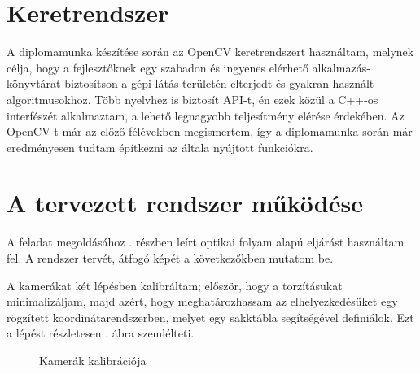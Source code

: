 \section{Keretrendszer}

A diplomamunka készítése során az OpenCV \cite{opencv} keretrendszert használtam, melynek célja, hogy a fejlesztőknek egy szabadon és ingyenes elérhető alkalmazás-könyvtárat biztosítson a gépi látás területén elterjedt és gyakran használt algoritmusokhoz. Több nyelvhez is biztosít API-t, én ezek közül a C++-os interfészét alkalmaztam, a lehető legnagyobb teljesítmény elérése érdekében. Az OpenCV-t már az előző félévekben megismertem, így a diplomamunka során már eredményesen tudtam építkezni az általa nyújtott funkciókra.

\section{A tervezett rendszer működése}

A feladat megoldásához . részben leírt optikai folyam alapú eljárást használtam fel. A rendszer tervét, átfogó képét a következőkben mutatom be.

A kamerákat két lépésben kalibráltam; először, hogy a torzításukat minimalizáljam, majd azért, hogy meghatározhassam az elhelyezkedésüket egy rögzített koordinátarendszerben, melyet egy sakktábla segítségével definiálok. Ezt a lépést részletesen . ábra szemlélteti.

\begin{figure}[tbh]
\centering


\caption{Kamerák kalibrációja \label{fig:plan-calibration}}
\end{figure}

